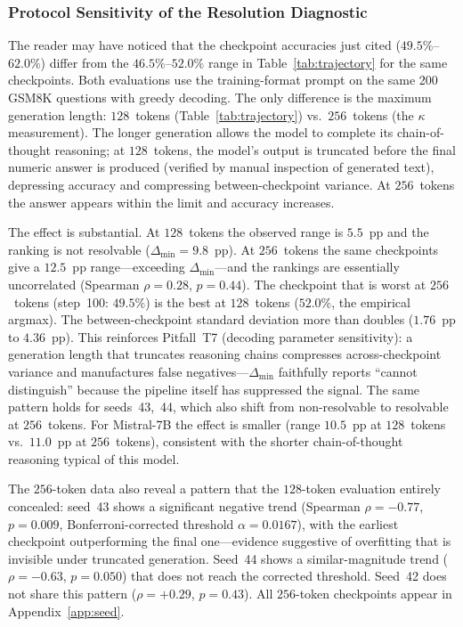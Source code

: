 \documentclass[pdflatex,sn-mathphys-ay,iicol]{sn-jnl}
\theoremstyle{thmstylethree}
\begin{document}
\begin{table}[t]
\subsubsection{Protocol Sensitivity of the Resolution Diagnostic}\label{sec:protocol_sensitivity}

The reader may have noticed that the checkpoint accuracies just cited ($49.5\%$--$62.0\%$) differ from the $46.5\%$--$52.0\%$ range in Table~\ref{tab:trajectory} for the same checkpoints. Both evaluations use the training-format prompt on the same 200 GSM8K questions with greedy decoding. The only difference is the maximum generation length: $128$~tokens (Table~\ref{tab:trajectory}) vs.\ $256$~tokens (the $\kappa$ measurement). The longer generation allows the model to complete its chain-of-thought reasoning; at $128$~tokens, the model's output is truncated before the final numeric answer is produced (verified by manual inspection of generated text), depressing accuracy and compressing between-checkpoint variance. At $256$~tokens the answer appears within the limit and accuracy increases.

The effect is substantial. At $128$~tokens the observed range is $5.5$~pp and the ranking is not resolvable ($\Delta_{\min}=9.8$~pp). At $256$~tokens the same checkpoints give a $12.5$~pp range---exceeding $\Delta_{\min}$---and the rankings are essentially uncorrelated (Spearman $\rho=0.28$, $p=0.44$). The checkpoint that is worst at $256$~tokens (step~100: $49.5\%$) is the best at $128$~tokens ($52.0\%$, the empirical argmax). The between-checkpoint standard deviation more than doubles ($1.76$~pp to $4.36$~pp). This reinforces Pitfall~T7 (decoding parameter sensitivity): a generation length that truncates reasoning chains compresses across-checkpoint variance and manufactures false negatives---$\Delta_{\min}$ faithfully reports ``cannot distinguish'' because the pipeline itself has suppressed the signal. The same pattern holds for seeds~43,~44, which also shift from non-resolvable to resolvable at $256$~tokens. For Mistral-7B the effect is smaller (range $10.5$~pp at $128$~tokens vs.\ $11.0$~pp at $256$~tokens), consistent with the shorter chain-of-thought reasoning typical of this model.

The $256$-token data also reveal a pattern that the $128$-token evaluation entirely concealed: seed~43 shows a significant negative trend (Spearman $\rho=-0.77$, $p=0.009$, Bonferroni-corrected threshold $\alpha=0.0167$), with the earliest checkpoint outperforming the final one---evidence suggestive of overfitting that is invisible under truncated generation. Seed~44 shows a similar-magnitude trend ($\rho=-0.63$, $p=0.050$) that does not reach the corrected threshold. Seed~42 does not share this pattern ($\rho=+0.29$, $p=0.43$). All $256$-token checkpoints appear in Appendix~\ref{app:seed}.


\end{table}
\end{document}

